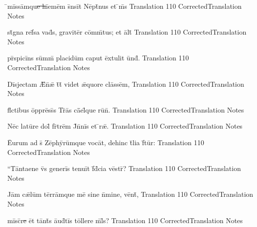 \documentclass[]{book}
\begin{document}
\latline
  {\={}m\=iss\=amqu\sout{e h}\={ie}m\=em s\={}ns\=it N\=ept\={}n\-us \-et \={\macron {\i}}m\={\macron {\i}}s}
  { Translation }
  {110}
  { CorrectedTranslation }
  { Notes }


\latline
  {st\={}gn\-a r\-ef\={}s\-a v\-ad\={\macron {\i}}s, gr\-av\-it\=er c\=omm\={}t\-us; \-et \=alt\={}}
  { Translation }
  {110}
  { CorrectedTranslation }
  { Notes }



\newpage

\latline
  {pr\={}sp\-ic\-i\={}ns s\=umm\={} pl\-ac\-id\=um c\-ap\-ut \=ext\-ul\-it \=und\={}.}
  { Translation }
  {110}
  { CorrectedTranslation }
  { Notes }


\latline
  {D\=isj\-ect\-am \={\AE}n\={}\={\ae} t\={}t\={} v\-id\-et \={\ae}qu\-or\-e cl\=ass\=em,}
  { Translation }
  {110}
  { CorrectedTranslation }
  { Notes }


\latline
  {fl\={}ct\-ib\-us \=oppr\=ess\={}s Tr\={}\=as c\={\=ae}l\={\macron {\i}}qu\-e r\-u\={\macron {\i}}n\={}.}
  { Translation }
  {110}
  { CorrectedTranslation }
  { Notes }



\newpage

\latline
  {N\=ec l\-at\-u\={}r\-e d\-ol\={\macron {\i}} fr\={}tr\=em J\={}n\={}n\=is \-et \={\macron {\i}}r\={\ae}.}
  { Translation }
  {110}
  { CorrectedTranslation }
  { Notes }


\latline
  {\={Eu}r\-um \-ad s\={} Z\=eph\=yr\=umqu\-e v\-oc\=at, d\-eh\-inc t\={}l\-i\-a f\={}t\=ur:}
  { Translation }
  {110}
  { CorrectedTranslation }
  { Notes }


\latline
  {``T\=ant\-aen\-e v\={}s g\-en\-er\=is t\-en\-u\=it f\={\macron {\i}}d\={}c\-i\-a v\=estr\={\macron {\i}}?}
  { Translation }
  {110}
  { CorrectedTranslation }
  { Notes }



\newpage

\latline
  {J\=am c\={\ae}l\=um t\=err\=amqu\-e m\-e\={} s\-in\-e n\={}m\-in\-e, v\=ent\={\macron {\i}},}
  { Translation }
  {110}
  { CorrectedTranslation }
  { Notes }


\latline
  {m\=isc\={}r\sout{e }\=et t\=ant\={}s \={au}d\={}t\=is t\=oll\-er\-e m\={}l\={}s?}
  { Translation }
  {110}
  { CorrectedTranslation }
  { Notes }
\end{document}
